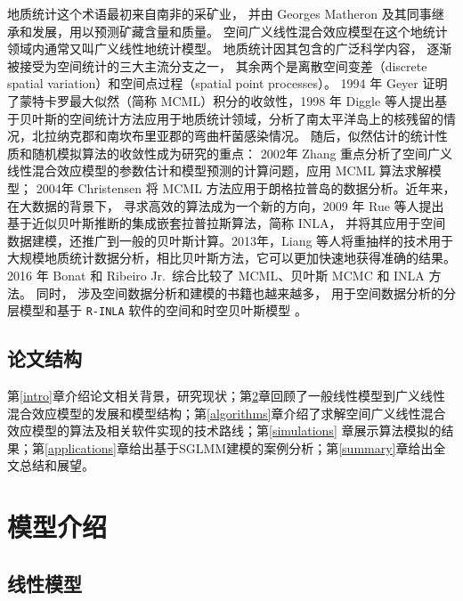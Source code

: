\documentclass[hyperref, a4paper, UTF8, zihao = -4, linespread = 1.25, scheme = chinese]{ctexbook}
\begin{document}
地质统计这个术语最初来自南非的采矿业\citep{Krige1951}， 并由 Georges
Matheron 及其同事继承和发展，用以预测矿藏含量和质量。
空间广义线性混合效应模型在这个地统计领域内通常又叫广义线性地统计模型。
地质统计因其包含的广泛科学内容，
逐渐被接受为空间统计的三大主流分支之一，
其余两个是离散空间变差（discrete spatial
variation）和空间点过程（spatial point processes）\citep{Cressie1993}。
1994 年 Geyer 证明了蒙特卡罗最大似然（简称
MCML）积分的收敛性\citep{Geyer1994On}，1998 年 Diggle
等人提出基于贝叶斯的空间统计方法应用于地质统计领域，分析了南太平洋岛上的核残留的情况，北拉纳克郡和南坎布里亚郡的弯曲杆菌感染情况\citep{Diggle1998}。
随后，似然估计的统计性质和随机模拟算法的收敛性成为研究的重点： 2002年
Zhang
重点分析了空间广义线性混合效应模型的参数估计和模型预测的计算问题，应用
MCML \citep{Zhang2002On} 算法求解模型； 2004年 Christensen 将 MCML
方法应用于朗格拉普岛的数据分析\citep{Christensen2004}。近年来，在大数据的背景下，
寻求高效的算法成为一个新的方向，2009 年 Rue
等人提出基于近似贝叶斯推断的集成嵌套拉普拉斯算法，简称
INLA\citep{INLA2009}，
并将其应用于空间数据建模\citep{INLA2015}，还推广到一般的贝叶斯计算\citep{INLA2017}。2013年，Liang
等人将重抽样的技术用于大规模地质统计数据分析，相比贝叶斯方法\citep{Diggle1998}，它可以更加快速地获得准确的结果\citep{Resampling2013}。2016
年 Bonat 和 Ribeiro Jr.~综合比较了 MCML、贝叶斯 MCMC 和 INLA
方法\citep{Bonat2016Practical}。 同时，
涉及空间数据分析和建模的书籍也越来越多，
用于空间数据分析的分层模型\citep{Banerjee2015}和基于 \texttt{R-INLA}
软件的空间和时空贝叶斯模型 \citep{Blangiardo2015}。

\section{论文结构}

第\ref{intro}章介绍论文相关背景，研究现状；第\ref{models}章回顾了一般线性模型到广义线性混合效应模型的发展和模型结构；第\ref{algorithms}章介绍了求解空间广义线性混合效应模型的算法及相关软件实现的技术路线；第\ref{simulations}
章展示算法模拟的结果；第\ref{applications}章给出基于SGLMM建模的案例分析；第\ref{summary}章给出全文总结和展望。

\hypertarget{models}{%
\chapter{模型介绍}\label{models}}

\section{线性模型}
\end{document}
